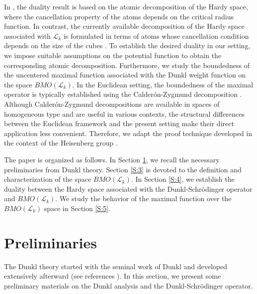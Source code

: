 \documentclass[11pt, reqno]{amsproc}
\theoremstyle{definition}
\theoremstyle{remark}
\numberwithin{equation}{section}
\begin{document}
In \cite{Dziubanski-2005}, the duality result is based on the atomic decomposition of the Hardy space, where the cancellation property of the atoms depends on the critical radius function. In contrast, the currently available decomposition of the Hardy space associated with $\mathcal{L}_k$ is formulated in terms of atoms whose cancellation condition depends on the size of the cubes \cite{Hejna-2021}. To establish the desired duality in our setting, we impose suitable assumptions on the potential function to obtain the corresponding atomic decomposition. Furthermore, we study the boundedness of the uncentered maximal function associated with the Dunkl weight function on the space $BMO(\mathcal{L}_k)$. In the Euclidean setting, the boundedness of the maximal operator is typically established using the Calder\'on-Zygmund  decomposition \cite{Bennett}. Although Calder\'on-Zygmund decompositions are available in spaces of homogeneous type and are useful in various contexts, the structural differences between the Euclidean framework and the present setting make their direct application less convenient. Therefore, we adapt the proof technique developed in the context of the Heisenberg group \cite{Lin}.

The paper is organized as follows. In Section \ref{S:2}, we recall the necessary preliminaries from Dunkl theory. Section \ref{S:3} is devoted to the definition and characterization of the space $BMO(\mathcal{L}_k)$. In Section \ref{S:4}, we establish the duality between the Hardy space associated with the Dunkl-Schr\"odinger operator and $BMO(\mathcal{L}_k)$. We study the behavior of the maximal function over the $BMO(\mathcal{L}_k)$ space in Section \ref{S:5}.

\section{Preliminaries}\label{S:2}
The Dunkl theory started with the seminal work of Dunkl and developed extensively afterward (see references \cite{D2, Rosler-03}). In this section, we present some preliminary materials on the Dunkl analysis and the Dunkl-Schr\"odinger operator. 
\end{document}
